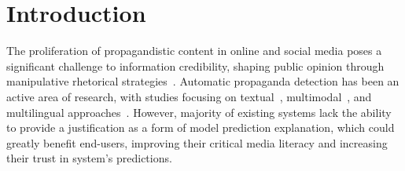 \section{Introduction}
\label{sec:introduction}


The proliferation of propagandistic content in online and social media poses a significant challenge to information credibility, shaping public opinion through manipulative rhetorical strategies~\cite{da-san-martino-etal-2019-fine}. Automatic propaganda detection has been an active area of research, with studies focusing on textual~\cite{barron2019proppy}, multimodal~\cite{ACL2021:propaganda:memes}, and multilingual approaches~\cite{piskorski-etal-2023-multilingual,zhang2022cross}. However, majority of existing systems lack the ability to provide a justification as a form of model prediction explanation, which could greatly benefit end-users, improving their critical media literacy and increasing their trust in system's predictions.  
 
